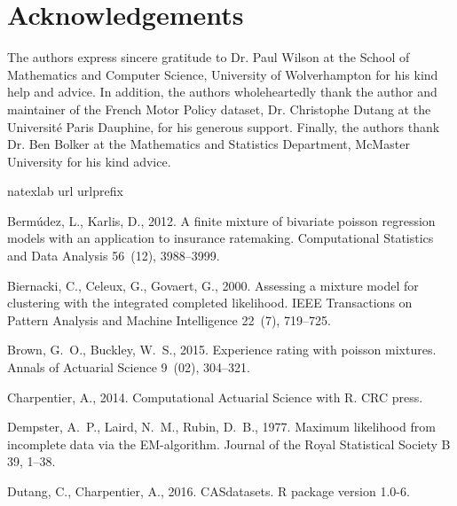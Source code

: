 \documentclass[12pt,letterpaper]{article}
\numberwithin{equation}{section}
\numberwithin{equation}{section}
\numberwithin{equation}{section}
\begin{document}
\section*{Acknowledgements}
The authors express sincere gratitude to Dr. Paul Wilson at the School of Mathematics and Computer Science, University of Wolverhampton for his kind help and advice. In addition, the authors wholeheartedly thank the author and maintainer of the French Motor Policy dataset, Dr. Christophe Dutang at the  Universit\' e Paris Dauphine, for his generous support. Finally, the authors thank Dr. Ben Bolker at the Mathematics and Statistics Department, McMaster University for his kind advice.

\begin{thebibliography}{36}
\expandafter\ifx\csname natexlab\endcsname\relax\def\natexlab#1{#1}\fi
\expandafter\ifx\csname url\endcsname\relax
  \def\url#1{\texttt{#1}}\fi
\expandafter\ifx\csname urlprefix\endcsname\relax\def\urlprefix{URL }\fi

Berm\'{u}dez, L., Karlis, D., 2012. A finite mixture of bivariate poisson
  regression models with an application to insurance ratemaking. Computational
  Statistics and Data Analysis 56~(12), 3988--3999.

Biernacki, C., Celeux, G., Govaert, G., 2000. Assessing a mixture model for
  clustering with the integrated completed likelihood. IEEE Transactions on
  Pattern Analysis and Machine Intelligence 22~(7), 719--725.

Brown, G.~O., Buckley, W.~S., 2015. Experience rating with poisson mixtures.
  Annals of Actuarial Science 9~(02), 304--321.

Charpentier, A., 2014. Computational Actuarial Science with R. CRC press.

Dempster, A.~P., Laird, N.~M., Rubin, D.~B., 1977. Maximum likelihood from
  incomplete data via the {EM}-algorithm. Journal of the Royal Statistical
  Society B 39, 1--38.

Dutang, C., Charpentier, A., 2016. {CASdatasets}. {R} package version 1.0-6.


\end{thebibliography}
\end{document}
